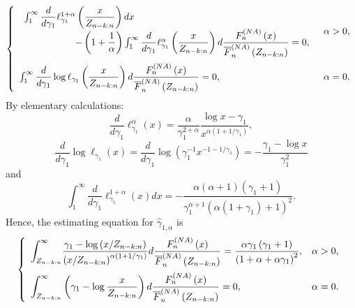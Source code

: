\documentclass[reqno,openbib,runningheads,a4paper,12pt]{amsart}%
\begin{document}
\[
\left\{
\begin{array}
[c]{lc}%
\begin{array}
[c]{l}%
\int_{1}^{\infty}\dfrac{d}{d\gamma_{1}}\ell_{\gamma_{1}}^{1+\alpha}\left(
\dfrac{x}{Z_{n-k:n}}\right)  dx\\
\ \ \ \ \ \ \ \ \ \ \ \ \ \ \ \ -\left(  1+\dfrac{1}{\alpha}\right)  \int%
_{1}^{\infty}\dfrac{d}{d\gamma_{1}}\ell_{\gamma_{1}}^{\alpha}\left(  \dfrac
{x}{Z_{n-k:n}}\right)  d\dfrac{F_{n}^{\left(  NA\right)  }\left(  x\right)
}{\overline{F}_{n}^{\left(  NA\right)  }\left(  Z_{n-k:n}\right)  }=0,
\end{array}
& \alpha>0,\medskip\\
\int_{1}^{\infty}\dfrac{d}{d\gamma_{1}}\log\ell_{\gamma_{1}}\left(  \dfrac
{x}{Z_{n-k:n}}\right)  d\dfrac{F_{n}^{\left(  NA\right)  }\left(  x\right)
}{\overline{F}_{n}^{\left(  NA\right)  }\left(  Z_{n-k:n}\right)  }=0, &
\alpha=0.
\end{array}
\right.
\]
By elementary calculations:%
\[
\dfrac{d}{d\gamma_{1}}\ell_{\gamma_{1}}^{\alpha}\left(  x\right)
=\frac{\alpha}{\gamma_{1}^{2+\alpha}}\frac{\log x-\gamma_{1}}{x^{\alpha\left(
1+1/\gamma_{1}\right)  }},
\]%
\[
\dfrac{d}{d\gamma_{1}}\log\ell_{\gamma_{1}}\left(  x\right)  =\dfrac
{d}{d\gamma_{1}}\log\left(  \gamma_{1}^{-1}x^{-1-1/\gamma_{1}}\right)
=-\frac{\gamma_{1}-\log x}{\gamma_{1}^{2}}%
\]
and%
\[
\int_{1}^{\infty}\dfrac{d}{d\gamma_{1}}\ell_{\gamma_{1}}^{1+\alpha}\left(
x\right)  dx=-\frac{\alpha\left(  \alpha+1\right)  \left(  \gamma
_{1}+1\right)  }{\gamma_{1}^{\alpha+1}\left(  \alpha\left(  1+\gamma
_{1}\right)  +1\right)  ^{2}}.
\]
Hence, the estimating equation for $\widehat{\gamma}_{1,\alpha}$ is
\begin{equation}
\left\{
\begin{array}
[c]{lc}%
{\displaystyle\int_{Z_{n-k:n}}^{\infty}}
\dfrac{\gamma_{1}-\log\left(  x/Z_{n-k:n}\right)  }{\left(  x/Z_{n-k:n}%
\right)  ^{\alpha\left(  1+1/\gamma_{1}\right)  }}d\dfrac{F_{n}^{\left(
NA\right)  }\left(  x\right)  }{\overline{F}_{n}^{\left(  NA\right)  }\left(
Z_{n-k:n}\right)  }=\dfrac{\alpha\gamma_{1}\left(  \gamma_{1}+1\right)
}{\left(  1+\alpha+\alpha\gamma_{1}\right)  ^{2}}, & \alpha>0,\medskip\\%
{\displaystyle\int_{Z_{n-k:n}}^{\infty}}
\left(  \gamma_{1}-\log\dfrac{x}{Z_{n-k:n}}\right)  d\dfrac{F_{n}^{\left(
NA\right)  }\left(  x\right)  }{\overline{F}_{n}^{\left(  NA\right)  }\left(
Z_{n-k:n}\right)  }=0, & \alpha=0.
\end{array}
\right.  \label{int-formula}%
\end{equation}
\end{document}
